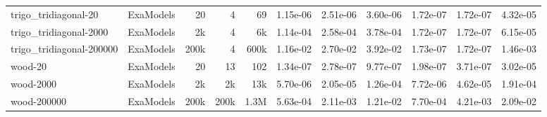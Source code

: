 {\begin{longtable}{@{}ll rrr rrr rr r@{}}
  trigo\_tridiagonal-20 & ExaModels & 20 & 4 & 69 & 1.15e-06 & 2.51e-06 & 3.60e-06 & 1.72e-07 & 1.72e-07 & 4.32e-05 \\
  trigo\_tridiagonal-2000 & ExaModels & 2k & 4 & 6k & 1.14e-04 & 2.58e-04 & 3.78e-04 & 1.72e-07 & 1.72e-07 & 6.15e-05 \\
  trigo\_tridiagonal-200000 & ExaModels & 200k & 4 & 600k & 1.16e-02 & 2.70e-02 & 3.92e-02 & 1.73e-07 & 1.72e-07 & 1.46e-03 \\
  wood-20 & ExaModels & 20 & 13 & 102 & 1.34e-07 & 2.78e-07 & 9.77e-07 & 1.98e-07 & 3.71e-07 & 3.02e-05 \\
  wood-2000 & ExaModels & 2k & 2k & 13k & 5.70e-06 & 2.05e-05 & 1.26e-04 & 7.72e-06 & 4.62e-05 & 1.91e-04 \\
  wood-200000 & ExaModels & 200k & 200k & 1.3M & 5.63e-04 & 2.11e-03 & 1.21e-02 & 7.70e-04 & 4.21e-03 & 2.09e-02 \\
  \bottomrule
\end{longtable}
}
